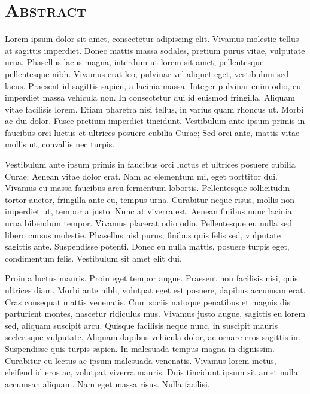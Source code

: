 \cleardoublepage
\section*{\textsc{\huge Abstract}}



Lorem ipsum dolor sit amet, consectetur adipiscing elit. Vivamus molestie tellus at sagittis imperdiet. Donec mattis massa sodales, pretium purus vitae, vulputate urna. Phasellus lacus magna, interdum ut lorem sit amet, pellentesque pellentesque nibh. Vivamus erat leo, pulvinar vel aliquet eget, vestibulum sed lacus. Praesent id sagittis sapien, a lacinia massa. Integer pulvinar enim odio, eu imperdiet massa vehicula non. In consectetur dui id euismod fringilla. Aliquam vitae facilisis lorem. Etiam pharetra nisi tellus, in varius quam rhoncus ut. Morbi ac dui dolor. Fusce pretium imperdiet tincidunt. Vestibulum ante ipsum primis in faucibus orci luctus et ultrices posuere cubilia Curae; Sed orci ante, mattis vitae mollis ut, convallis nec turpis.

Vestibulum ante ipsum primis in faucibus orci luctus et ultrices posuere cubilia Curae; Aenean vitae dolor erat. Nam ac elementum mi, eget porttitor dui. Vivamus eu massa faucibus arcu fermentum lobortis. Pellentesque sollicitudin tortor auctor, fringilla ante eu, tempus urna. Curabitur neque risus, mollis non imperdiet ut, tempor a justo. Nunc at viverra est. Aenean finibus nunc lacinia urna bibendum tempor. Vivamus placerat odio odio. Pellentesque eu nulla sed libero cursus molestie. Phasellus nisl purus, finibus quis felis sed, vulputate sagittis ante. Suspendisse potenti. Donec eu nulla mattis, posuere turpis eget, condimentum felis. Vestibulum sit amet elit dui.

Proin a luctus mauris. Proin eget tempor augue. Praesent non facilisis nisi, quis ultrices diam. Morbi ante nibh, volutpat eget est posuere, dapibus accumsan erat. Cras consequat mattis venenatis. Cum sociis natoque penatibus et magnis dis parturient montes, nascetur ridiculus mus. Vivamus justo augue, sagittis eu lorem sed, aliquam suscipit arcu. Quisque facilisis neque nunc, in suscipit mauris scelerisque vulputate. Aliquam dapibus vehicula dolor, ac ornare eros sagittis in. Suspendisse quis turpis sapien. In malesuada tempus magna in dignissim. Curabitur eu lectus ac ipsum malesuada venenatis. Vivamus lorem metus, eleifend id eros ac, volutpat viverra mauris. Duis tincidunt ipsum sit amet nulla accumsan aliquam. Nam eget massa risus. Nulla facilisi.



